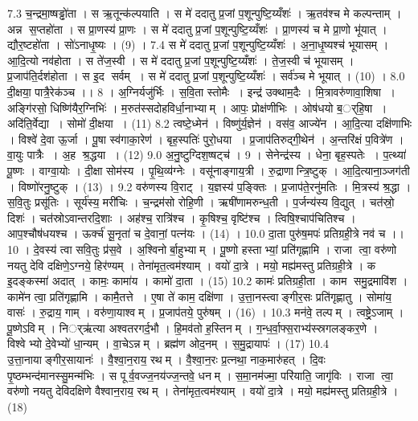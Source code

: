 7.3
च॒न्द्रमा॒ष्षड्ढो॑ता । स ऋ॒तून्क॑ल्पयाति । स मे॑ ददातु प्र॒जां प॒शून्पुष्टि॒य्यँशः॑ । ऋ॒तव॑श्च मे कल्पन्ताम् । अन्न स॒प्तहो॑ता । स प्रा॒णस्य॑ प्रा॒णः । स मे॑ ददातु प्र॒जां प॒शून्पुष्टि॒य्यँशः॑ । प्रा॒णस्य॑ च मे प्रा॒णो भू॑यात् । द्यौर॒ष्टहो॑ता । सो॑ऽनाधृ॒ष्यः । (9) ।
7.4
स मे॑ ददातु प्र॒जां प॒शून्पुष्टि॒य्यँशः॑ । अ॒ना॒धृ॒ष्यश्च॑ भूयासम् । आ॒दि॒त्यो नव॑होता । स ते॑ज॒स्वी । स मे॑ ददातु प्र॒जां प॒शून्पुष्टि॒य्यँशः॑ । ते॒ज॒स्वी च॑ भूयासम् । प्र॒जाप॑ति॒र्दश॑होता । स इ॒द सर्वम् । स मे॑ ददातु प्र॒जां प॒शून्पुष्टि॒य्यँशः॑ । सर्व॑ञ्च मे भूयात् । (10) ।
8.0
दी॒क्षया॒ पात्रै॒रेक॑ञ्च ।। 8 ।
अ॒ग्निर्यजु॑र्भिः । स॒वि॒ता स्तोमैः । इन्द्र॑ उक्थाम॒दैः । मि॒त्रावरु॑णावा॒शिषा । अङ्गि॑रसो॒ धिष्णि॑यैर॒ग्निभिः॑ । म॒रुत॑स्सदोहविर्धा॒नाभ्याम् । आपः॒ प्रोक्ष॑णीभिः । ओष॑धयो ब॒र््हि॒षा । अदि॑ति॒र्वेद्या । सोमो॑ दी॒क्षया । (11)
8.2
त्वष्टे॒ध्मेन॑ । विष्णु॑र्य॒ज्ञेन॑ । वस॑व॒ आज्ये॑न । आ॒दि॒त्या दक्षि॑णाभिः । विश्वे॑ दे॒वा ऊ॒र्जा । पू॒षा स्व॑गाका॒रेण॑ । बृह॒स्पतिः॑ पुरो॒धया । प्र॒जाप॑तिरुद्गी॒थेन॑ । अ॒न्तरि॑क्षं प॒वित्रे॑ण । वा॒युः पात्रैः । अ॒ह श्र॒द्धया । (12)
9.0
अ॒नु॒ष्टुग्दिश॒ष्षट्च॑ । 9 ।
सेनेन्द्र॑स्य । धेना॒ बृह॒स्पतेः । प॒त्थ्या॑ पू॒ष्णः । वाग्वा॒योः । दी॒क्षा सोम॑स्य । पृ॒थि॒व्य॑ग्नेः । वसू॑नाङ्गाय॒त्री । रु॒द्राणान्त्रि॒ष्टुक् । आ॒दि॒त्याना॒ञ्जग॑ती । विष्णो॑रनु॒ष्टुक् । (13) ।
9.2
वरु॑णस्य वि॒राट् । य॒ज्ञस्य॑ प॒ङ्क्तिः । प्र॒जाप॑ते॒रनु॑मतिः । मि॒त्रस्य॑ श्र॒द्धा । स॒वि॒तुः प्रसू॑तिः । सूर्य॑स्य॒ मरी॑चिः । च॒न्द्रम॑सो रोहि॒णी । ऋषी॑णामरुन्ध॒ती । प॒र्जन्य॑स्य वि॒द्युत् । चत॑स्रो॒ दिशः॑ । चत॑स्रोऽवान्तरदि॒शाः । अह॑श्च॒ रात्रि॑श्च । कृ॒षिश्च॒ वृष्टि॑श्च । त्विषि॒श्चाप॑चितिश्च । आप॒श्चौष॑धयश्च । ऊर्क्च॑ सू॒नृता॑ च दे॒वानां॒ पत्न॑यः । (14) ।
10.0
दा॒ता पुरु॑ष॒मपः॑ प्रतिग्रही॒त्रे नव॑ च ।। 10 ।
दे॒वस्य॑ त्वा सवि॒तुः प्र॑स॒वे । अ॒श्विनोर्बा॒हुभ्याम् । पू॒ष्णो हस्ताभ्यां॒ प्रति॑गृह्णामि । राजा त्वा॒ वरु॑णो नयतु देवि दक्षिणे॒ऽग्नये॒ हिर॑ण्यम् । तेना॑मृत॒त्वम॑श्याम् । वयो॑ दा॒त्रे । मयो॒ मह्य॑मस्तु प्रतिग्रही॒त्रे । क इ॒दङ्कस्मा॑ अदात् । कामः॒ कामा॑य । कामो॑ दा॒ता । (15)
10.2
कामः॑ प्रतिग्रही॒ता । काम समु॒द्रमावि॑श । कामे॑न त्वा॒ प्रति॑गृह्णामि । कामै॒तत्ते । ए॒षा ते॑ काम॒ दक्षि॑णा । उ॒त्ता॒नस्त्वाङ्गीर॒सः प्रति॑गृह्णातु । सोमा॑य॒ वासः॑ । रु॒द्राय॒ गाम् । वरु॑णा॒याश्वम् । प्र॒जाप॑तये॒ पुरु॑षम् । (16) ।
10.3
मन॑वे॒ तल्पम् । त्वष्ट्रे॒ऽजाम् । पू॒ष्णेऽविम् । निर््ऋ॑त्या अश्वतरगर्द॒भौ । हि॒मव॑तो ह॒स्तिनम् । ग॒न्ध॒र्वा॒फ्स॒राभ्य॑स्स्रगलङ्कर॒णे । विश्वेभ्यो दे॒वेभ्यो॑ धा॒न्यम् । वा॒चेऽन्नम् । ब्रह्म॑ण ओद॒नम् । स॒मु॒द्रायापः॑ । (17)
10.4
उ॒त्ता॒नायाङ्गीर॒सायानः॑ । वै॒श्वा॒न॒राय॒ रथम् । वै॒श्वा॒न॒रः प्र॒त्नथा॒ नाक॒मारु॑हत् । दि॒वः पृ॒ष्ठम्भन्द॑मानस्सु॒मन्म॑भिः । स पूर्व॒वज्ज॒नय॑ज्ज॒न्तवे॒ धनम् । स॒मा॒नम॑ज्मा॒ परि॑याति॒ जागृ॑विः । राजा त्वा॒ वरु॑णो नयतु देविदक्षिणे वैश्वान॒राय॒ रथम् । तेना॑मृत॒त्वम॑श्याम् । वयो॑ दा॒त्रे । मयो॒ मह्य॑मस्तु प्रतिग्रही॒त्रे । (18)
